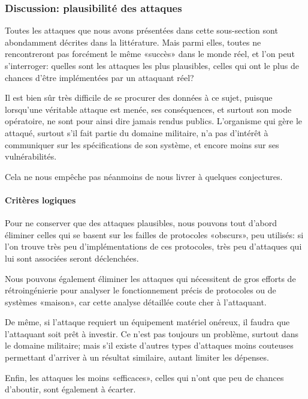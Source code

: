     \subsubsection{Discussion: plausibilité des attaques}
Toutes les attaques que nous avons présentées dans cette sous-section sont abondamment décrites dans la littérature.
Mais parmi elles, toutes ne rencontreront pas forcément le même «succès» dans le monde réel, et l'on peut s'interroger: quelles sont les attaques les plus plausibles, \cad celles qui ont le plus de chances d'être implémentées par un attaquant réel?

Il est bien sûr très difficile de se procurer des données à ce sujet, puisque lorsqu'une véritable attaque est menée, ses conséquences, et surtout son mode opératoire, ne sont pour ainsi dire jamais rendus publics.
L'organisme qui gère le \rc attaqué, surtout s'il fait partie du domaine militaire, n'a pas d'intérêt à communiquer sur les spécifications de son système, et encore moins sur ses vulnérabilités.

Cela ne nous empêche pas néanmoins de nous livrer à quelques conjectures.

        \paragraph{Critères logiques}
Pour ne conserver que des attaques plausibles, nous pouvons tout d'abord éliminer celles qui se basent sur les failles de protocoles «obscurs», peu utilisés: si l'on trouve très peu d'implémentations de ces protocoles, très peu d'attaques qui lui sont associées seront déclenchées.

Nous pouvons également éliminer les attaques qui nécessitent de gros efforts de rétroingénierie pour analyser le fonctionnement précis de protocoles ou de systèmes «maison», car cette analyse détaillée coute cher à l'attaquant.

De même, si l'attaque requiert un équipement matériel onéreux, il faudra que l'attaquant soit prêt à investir.
Ce n'est pas toujours un problème, surtout dans le domaine militaire; mais s'il existe d'autres types d'attaques moins couteuses permettant d'arriver à un résultat similaire, autant limiter les dépenses.

Enfin, les attaques les moins «efficaces», celles qui n'ont que peu de chances d'aboutir, sont également à écarter.

